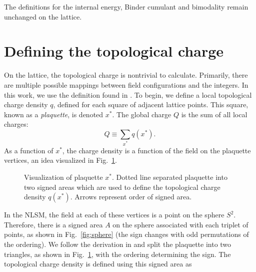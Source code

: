 The definitions for the internal energy, Binder cumulant and bimodality remain unchanged on the lattice.

\section{Defining the topological charge}
On the lattice, the topological charge is nontrivial to calculate. Primarily, there are multiple possible mappings between field configurations and the integers. In this work, we use the definition found in \cite{berg1981}. To begin, we define a local topological charge density $q$, defined for each square of adjacent lattice points. This square, known as a \textit{plaquette}, is denoted $x^*$. The global charge $Q$ is the sum of all local charges:
\begin{equation}
    Q \equiv \sum_{x^*} q(x^*).
\end{equation}
As a function of $x^*$, the charge density is a function of the field on the plaquette vertices, an idea visualized in Fig.~\ref{fig:plaquette}.
\begin{figure}
    \centering
    \caption{\label{fig:plaquette} Visualization of plaquette $x^*$. Dotted line separated plaquette into two signed areas which are used to define the topological charge density $q(x^*)$. Arrows represent order of signed area.}
\end{figure}
In the NLSM, the field at each of these vertices is a point on the sphere $S^2$. Therefore, there is a signed area $A$ on the sphere associated with each triplet of points, as shown in Fig.~\ref{fig:sphere} (the sign changes with odd permutations of the ordering). We follow the derivation in \cite{berg1981} and split the plaquette into two triangles, as shown in Fig.~\ref{fig:plaquette}, with the ordering determining the sign. The topological charge density is defined using this signed area as
